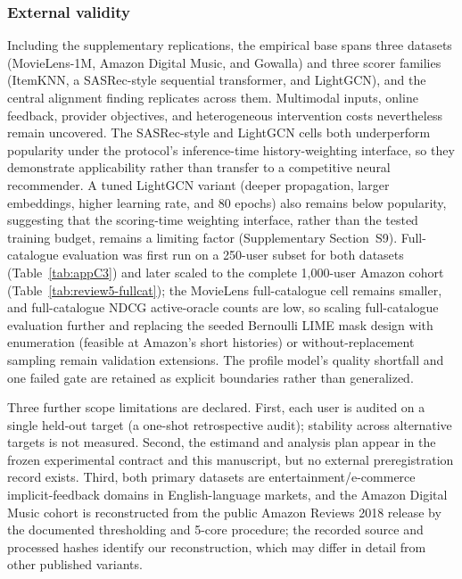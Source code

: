 \documentclass[manuscript,screen,review,anonymous]{acmart}
\begin{document}
\subsubsection{External validity}
Including the supplementary replications, the empirical base spans three datasets (MovieLens-1M, Amazon Digital Music, and Gowalla) and three scorer families (ItemKNN, a SASRec-style sequential transformer, and LightGCN), and the central alignment finding replicates across them. Multimodal inputs, online feedback, provider objectives, and heterogeneous intervention costs nevertheless remain uncovered. The SASRec-style and LightGCN cells both underperform popularity under the protocol's inference-time history-weighting interface, so they demonstrate applicability rather than transfer to a competitive neural recommender. A tuned LightGCN variant (deeper propagation, larger embeddings, higher learning rate, and 80 epochs) also remains below popularity, suggesting that the scoring-time weighting interface, rather than the tested training budget, remains a limiting factor (Supplementary Section~S9). Full-catalogue evaluation was first run on a 250-user subset for both datasets (Table~\ref{tab:appC3}) and later scaled to the complete 1,000-user Amazon cohort (Table~\ref{tab:review5-fullcat}); the MovieLens full-catalogue cell remains smaller, and full-catalogue NDCG active-oracle counts are low, so scaling full-catalogue evaluation further and replacing the seeded Bernoulli LIME mask design with enumeration (feasible at Amazon's short histories) or without-replacement sampling remain validation extensions. The profile model's quality shortfall and one failed gate are retained as explicit boundaries rather than generalized.

Three further scope limitations are declared. First, each user is audited on a single held-out target (a one-shot retrospective audit); stability across alternative targets is not measured. Second, the estimand and analysis plan appear in the frozen experimental contract and this manuscript, but no external preregistration record exists. Third, both primary datasets are entertainment/e-commerce implicit-feedback domains in English-language markets, and the Amazon Digital Music cohort is reconstructed from the public Amazon Reviews 2018 release by the documented thresholding and 5-core procedure; the recorded source and processed hashes identify our reconstruction, which may differ in detail from other published variants.
\end{document}
